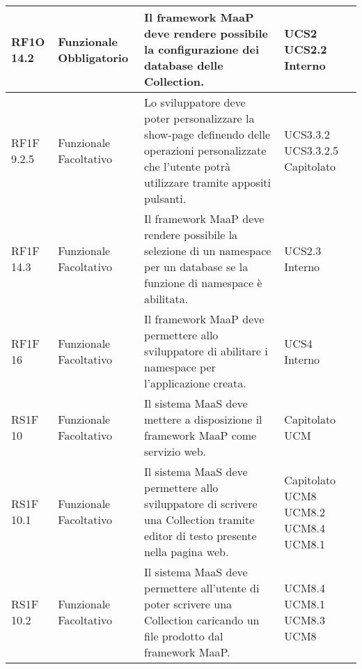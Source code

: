 \begin{center}
\begin{longtable}{ | l | p{2cm} | p{5cm} | p{1.7cm} |}
        RF1O 14.2 & Funzionale \newline  Obbligatorio  & Il framework MaaP deve rendere possibile la configurazione dei database delle Collection. &  UCS2 \newline  UCS2.2 \newline  Interno \newline  \\ \hline      
        RF1F 9.2.5 & Funzionale \newline  Facoltativo  & Lo sviluppatore deve poter personalizzare la show-page definendo delle operazioni personalizzate che l'utente potrà utilizzare tramite appositi pulsanti. &  UCS3.3.2 \newline  UCS3.3.2.5 \newline  Capitolato \newline  \\ \hline      
        RF1F 14.3 & Funzionale \newline  Facoltativo  & Il framework MaaP deve rendere possibile la selezione di un namespace per un database se la funzione di namespace è abilitata. &  UCS2.3 \newline  Interno \newline  \\ \hline      
        RF1F 16 & Funzionale \newline  Facoltativo  & Il framework MaaP deve permettere allo sviluppatore di abilitare i namespace per l'applicazione creata. &  UCS4 \newline  Interno \newline  \\ \hline      
        RS1F 10 & Funzionale \newline  Facoltativo  & Il sistema MaaS deve mettere a disposizione il framework MaaP come servizio web. &  Capitolato \newline  UCM \newline  \\ \hline      
        RS1F 10.1 & Funzionale \newline  Facoltativo  & Il sistema MaaS deve permettere allo sviluppatore di scrivere una Collection tramite editor di testo presente nella pagina web. &  Capitolato \newline  UCM8 \newline  UCM8.2 \newline  UCM8.4 \newline  UCM8.1 \newline  \\ \hline      
        RS1F 10.2 & Funzionale \newline  Facoltativo  & Il sistema MaaS deve permettere all'utente di poter scrivere una Collection caricando un file prodotto dal framework MaaP. &  UCM8.4 \newline  UCM8.1 \newline  UCM8.3 \newline  UCM8 \newline  \\ \hline      

\end{longtable}
\end{center}
